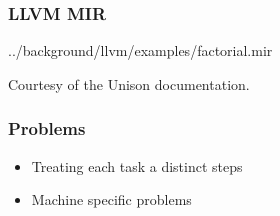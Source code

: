 \begin{frame}
	\frametitle{LLVM MIR}

	
	{../background/llvm/examples/factorial.mir}

	Courtesy of the Unison documentation.
\end{frame}

\begin{frame}
	\frametitle{Problems}

	\begin{itemize}
		\item Treating each task a distinct steps
		\item Machine specific problems
	\end{itemize}
\end{frame}
